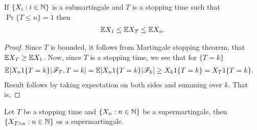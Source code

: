 \documentclass[a4paper,10pt,english]{article}
\begin{document}
\begin{lem}
\label{StoppingTimeBound}
If $\{X_i:  i \in \mathbb{N} \}$ is  a submartingale and $T$ is a stopping time such that $\Pr\{T \leq n\}=1$ then
\begin{align*}
 \mathbb{E} X_1 \leq \mathbb{E} X_T \leq \mathbb{E} X_n.
\end{align*}
\end{lem}
\begin{proof}
Since $T$ is bounded, it follows from Martingale stopping theorem, that $\mathbb{E} X_T  \geq \mathbb{E} X_1$. 
Now, since $T$ is a stopping time, we see that for $\{T = k\}$
\begin{align*}
\E[X_n1\{T = k\}|\F_T,T=k]&= %
\E[X_n1\{T = k\}|\F_k] \geq X_k1\{T = k \} = X_T1\{T = k\}.
\end{align*}
Result follows by taking expectation on both sides and summing over $k$. 
That is,
\end{proof}

\begin{cor}  
Let $T$ be a stopping time and $\{X_n : n \in \mathbb{N}\}$ be a supermartingale, 
then $\{X_{T\wedge n}: n \in \mathbb{N}\}$ os a supermartingale. 
\end{cor}
\end{document}
